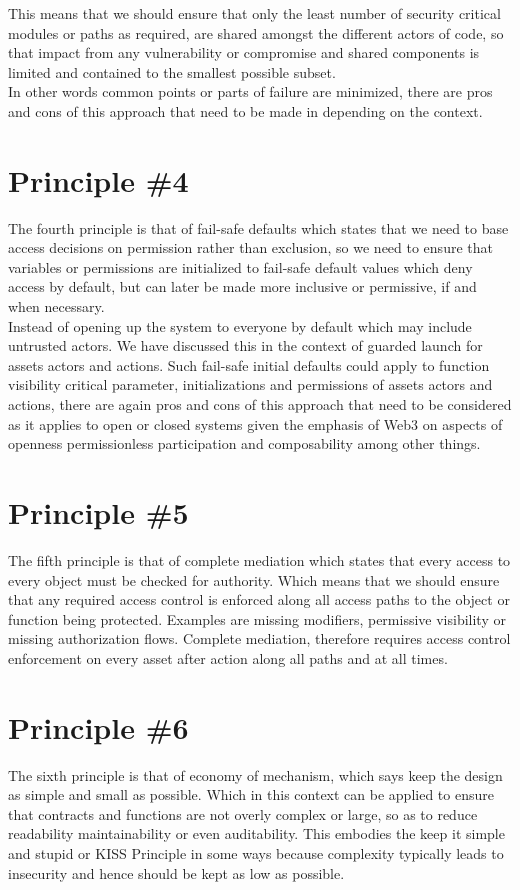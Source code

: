 This means that we should ensure that only the least number of security critical modules or paths as required, are shared amongst the different actors of code, so that impact from any vulnerability or compromise and shared components is limited and contained to the smallest possible subset.\\

In other words common points or parts of failure are minimized, there are pros and cons of this approach that need to be made in depending on the context.

\section{Principle \#4}
The fourth principle is that of fail-safe defaults which states that we need to base access decisions on permission rather than exclusion, so we need to ensure that variables or permissions are initialized to fail-safe default values which deny access by default, but can later be made more inclusive or permissive, if and when necessary.\\ 

Instead of opening up the system to everyone by default which may include untrusted actors. We have discussed this in the context of guarded launch for assets actors and actions. Such fail-safe initial defaults could apply to function visibility critical parameter, initializations and permissions of assets actors and actions, there are again pros and cons of this approach that need to be considered as it applies to open or closed systems given the emphasis of Web3 on aspects of openness permissionless participation and composability among other things.

\section{Principle \#5}
The fifth principle is that of complete mediation which states that every access to every object must be checked for authority. Which means that we should ensure that any required access control is enforced along all access paths to the object or function being protected. Examples are missing modifiers, permissive visibility or missing authorization flows. Complete mediation, therefore requires access control enforcement on every asset after action along all paths and at all times.

\section{Principle \#6}
The sixth principle is that of economy of mechanism, which says keep the design as simple and small as possible. Which in this context can be applied to ensure that contracts and functions are not overly complex or large, so as to reduce readability maintainability or even auditability. This embodies the keep it simple and stupid or KISS Principle in some ways because complexity typically leads to insecurity and hence should be kept as low as possible.

